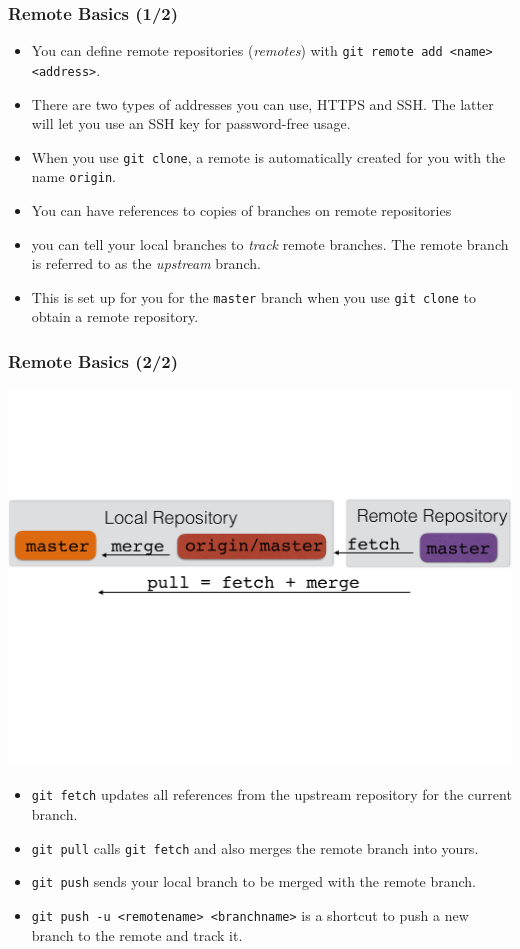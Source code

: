 \documentclass{beamer}
\begin{document}
\begin{frame}[fragile]
\frametitle{Remote Basics (1/2)}
\begin{itemize}
\item
You can define remote repositories (\emph{remotes}) with \lstinline{git remote add <name> <address>}.
\item There are two types of addresses you can use, HTTPS and SSH. The latter will let you use an SSH key for password-free usage.
\item When you use \lstinline{git clone}, a remote is automatically created for you with the name \texttt{origin}.
\item You can have references to copies of branches on remote repositories
\item you can tell your local branches to \emph{track} remote branches. The remote branch is referred to as the \emph{upstream} branch.
\item This is set up for you for the \lstinline{master} branch when you use \lstinline{git clone} to obtain a remote repository.
\end{itemize}
\end{frame}

\begin{frame}[fragile]
\frametitle{Remote Basics (2/2)}
\includegraphics[width=\textwidth]{fetchcartoon}
\begin{itemize}
\item \lstinline{git fetch} updates all references from the upstream repository for the current branch.
\item \lstinline{git pull} calls \lstinline{git fetch} and also merges the remote branch into yours.
\item \lstinline{git push} sends your local branch to be merged with the remote branch.
\item \lstinline{git push -u <remotename> <branchname>} is a shortcut to push a new branch to the remote and track it.
\end{itemize}
\end{frame}
\end{document}
